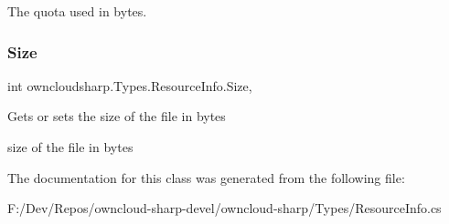 The quota used in bytes.\mbox{\label{classowncloudsharp_1_1_types_1_1_resource_info_a57a5a4cfa8448999170ff68297d262f1}} 
\subsubsection{\texorpdfstring{Size}{Size}}
{\footnotesize\ttfamily int owncloudsharp.\+Types.\+Resource\+Info.\+Size\hspace{0.3cm}{\ttfamily [get]}, {\ttfamily [set]}}



Gets or sets the size of the file in bytes 

size of the file in bytes

The documentation for this class was generated from the following file\+:\begin{DoxyCompactItemize}
\item 
F\+:/\+Dev/\+Repos/owncloud-\/sharp-\/devel/owncloud-\/sharp/\+Types/Resource\+Info.\+cs\end{DoxyCompactItemize}
